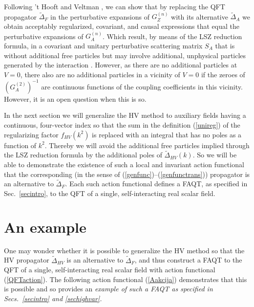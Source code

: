 \documentclass[a4paper,12pt]{article}
\newcommand{\Lagi}{V}
\newcommand{\prop}{\widetilde{\Delta}}
\newcommand{\propF}{\prop_F}
\newcommand{\propA}{\prop_A}
\newcommand{\propR}{\prop_{HV}}
\newcommand{\unreg}{f_{HV}}
\newcommand{\Gf}{G^{(n)}}
\newcommand{\GfZ}{\Gf_Z}
\newcommand{\GfA}{\Gf_A}
\newcommand{\SmA}{S_A}
\begin{document}
Following 't Hooft and Veltman \cite{Hooft}, we can show that by replacing the QFT propagator $\propF$ in the perturbative expansions of $\GfZ$ with its alternative $\propA$ we obtain acceptably regularized, covariant, and causal expressions that equal the perturbative expansions of $\GfA$. Which result, by means of the LSZ reduction formula, in a covariant and unitary perturbative scattering matrix $\SmA$ that is without additional free particles but may involve additional, unphysical particles generated by the interaction \cite{Hooft}. However, as there are no additional particles at $\Lagi = 0$, there also are no additional particles in a vicinity of $\Lagi = 0$ if the zeroes of $(G_A^{(2)})^{-1}$ are continuous functions of the coupling coefficients in this vicinity. However, it is an open question when this is so.

In the next section we will generalize the HV method to auxiliary fields having a continuous, four-vector index so that the sum in the definition (\ref{unireg}) of the regularizing factor $\unreg(k^2)$ is replaced with an integral that has no poles as a function of $k^2$. Thereby we will avoid the additional free particles implied through the LSZ reduction formula by the additional poles of $\propR(k)$. So we will be able to demonstrate the existence of such a local and invariant action functional that the corresponding (in the sense of (\ref{genfunc})--(\ref{genfunctrans})) propagator is an alternative to $\propF$. Each such action functional defines a FAQT, as specified in Sec.~\ref{secintro}, to the QFT of a single, self-interacting real scalar field.

\section{An example}
\label{secproof}

One may wonder whether it is possible to generalize the HV method so that the HV propagator $\propR$ is an alternative to $\propF$, and thus construct a FAQT to the QFT of a single, self-interacting real scalar field with action functional (\ref{QFTaction}). The following action functional (\ref{Aakcija}) demonstrates that this is possible and so provides an \it example \rm of such a FAQT as specified in Secs.~\ref{secintro} and \ref{sechighvar}.
\end{document}
